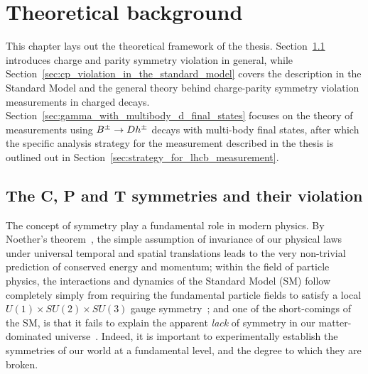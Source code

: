 

\chapter{Theoretical background}
\label{ch:2-litreview}

\minitoc

This chapter lays out the theoretical framework of the thesis. Section~\ref{sec:the_c_and_p_symmetries_and_their_violation} introduces charge and parity symmetry violation in general, while Section~\ref{sec:cp_violation_in_the_standard_model} covers the description in the Standard Model and the general theory behind charge-parity symmetry violation measurements in charged \B decays. Section~\ref{sec:gamma_with_multibody_d_final_states} focuses on the theory of measurements using ${{B}^\pm}\rightarrow{\ensuremath{D}} h^\pm$ decays with multi-body \D final states, after which the specific analysis strategy for the measurement described in the thesis is outlined out in Section~\ref{sec:strategy_for_lhcb_measurement}.


\section{The C, P and T symmetries and their violation} %
\label{sec:the_c_and_p_symmetries_and_their_violation}

The concept of symmetry play a fundamental role in modern physics. By Noether's theorem~\cite{noetherInvarianteVariationsprobleme1918}, the simple assumption of invariance of our physical laws under universal temporal and spatial translations leads to the very non-trivial prediction of conserved energy and momentum; 
%
within the field of particle physics, the interactions and dynamics of the Standard Model (SM) follow completely simply from requiring the fundamental particle fields to satisfy a local $U(1)\times SU(2)\times SU(3)$ gauge symmetry~\cite{donoghueDynamicsStandardModel2014};  
%
 and one of the short-comings of the SM, is that it fails to explain the apparent \emph{lack} of symmetry in our matter-dominated universe~\cite{sakarovViolationCPInvariance1966}.   
 Indeed, it is important to experimentally establish the symmetries of our world at a fundamental level, and the degree to which they are broken.

